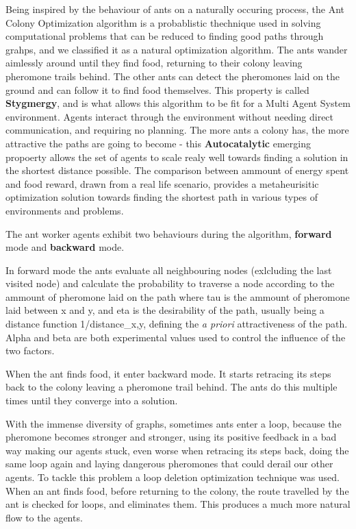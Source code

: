 \documentclass[times, 10pt,twocolumn]{article}
\begin{document}
	

Being inspired by the behaviour of ants on a naturally occuring process, the Ant Colony Optimization algorithm is a probablistic thechnique used in solving computational problems that can be reduced to finding good paths through grahps, and we classified it as a natural optimization algorithm. The ants wander aimlessly around until they find food, returning to their colony leaving pheromone trails behind. The other ants can detect the pheromones laid on the ground and can follow it to find food themselves. This property is called \textbf{Stygmergy}, and is what allows this algorithm to be fit for a Multi Agent System environment. Agents interact through the environment without needing direct communication, and requiring no planning. The more ants a colony has, the more attractive the paths are going to become - this \textbf{Autocatalytic} emerging propoerty allows the set of agents to scale realy well towards finding a solution in the shortest distance possible. The comparison between ammount of energy spent and food reward, drawn from a real life scenario, provides a metaheurisitic optimization solution towards finding the shortest path in various types of environments and problems.
	
	 

The ant worker agents exhibit two behaviours during the algorithm, \textbf{forward} mode and \textbf{backward} mode. 


In forward mode the ants evaluate all neighbouring nodes (exlcluding the last visited node) and calculate the probability to traverse a node according to the ammount of pheromone laid on the path
where tau is the ammount of pheromone laid between x and y, and eta is the desirability of the path, usually being a distance function 1/distance\_{x,y}, defining the \textit{a priori} attractiveness of the path. Alpha and beta are both experimental values used to control the influence of the two factors.


When the ant finds food, it enter backward mode. It starts retracing its steps back to the colony leaving a pheromone trail behind. The ants do this multiple times until they converge into a solution.

With the immense diversity of graphs, sometimes ants enter a loop, because the pheromone becomes stronger and stronger, using its positive feedback in a bad way making our agents stuck, even worse when retracing its steps back, doing the same loop again and laying dangerous pheromones that could derail our other agents. To tackle this problem a loop deletion optimization technique was used. When an ant finds food, before returning to the colony, the route travelled by the ant is checked for loops, and eliminates them. This produces a much more natural flow to the agents.
\end{document}

